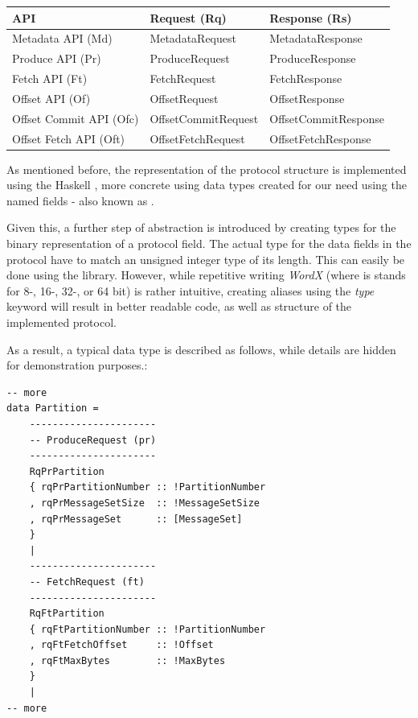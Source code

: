 \begin{table}[h]
\centering
\begin{tabular}{|l|l|l|}
\hline
\textbf{API}            & \textbf{Request (Rq)} & \textbf{Response (Rs)} \\ \hline
Metadata API (Md)       & MetadataRequest       & MetadataResponse       \\ \hline
Produce API (Pr)        & ProduceRequest        & ProduceResponse        \\ \hline
Fetch API (Ft)          & FetchRequest          & FetchResponse          \\ \hline
Offset API (Of)         & OffsetRequest         & OffsetResponse         \\ \hline
Offset Commit API (Ofc) & OffsetCommitRequest   & OffsetCommitResponse   \\ \hline
Offset Fetch API (Oft)  & OffsetFetchRequest    & OffsetFetchResponse    \\ \hline
\end{tabular}
\end{table}

As mentioned before, the representation of the protocol structure is
implemented using the Haskell , more concrete using data types created
for our need using the named fields - also known as .

Given this, a further step of abstraction is introduced by creating types for
the binary representation of a protocol field. The actual type for the data
fields in the protocol have to match an unsigned integer type of its length.
This can easily be done using the
library. However, while repetitive writing \textit{WordX} (where is stands for
8-, 16-, 32-, or 64 bit) is rather intuitive, creating aliases using the
\textit{type} keyword will result in better readable code, as well as structure
of the implemented protocol.

As a result, a typical data type is described as follows, while details are
hidden for demonstration purposes.:

\begin{lstlisting}
-- more
data Partition =
    ----------------------
    -- ProduceRequest (pr)
    ----------------------
    RqPrPartition
    { rqPrPartitionNumber :: !PartitionNumber
    , rqPrMessageSetSize  :: !MessageSetSize
    , rqPrMessageSet      :: [MessageSet]
    }
    |
    ----------------------
    -- FetchRequest (ft)
    ----------------------
    RqFtPartition
    { rqFtPartitionNumber :: !PartitionNumber
    , rqFtFetchOffset     :: !Offset
    , rqFtMaxBytes        :: !MaxBytes
    }
    |
-- more
\end{lstlisting}

